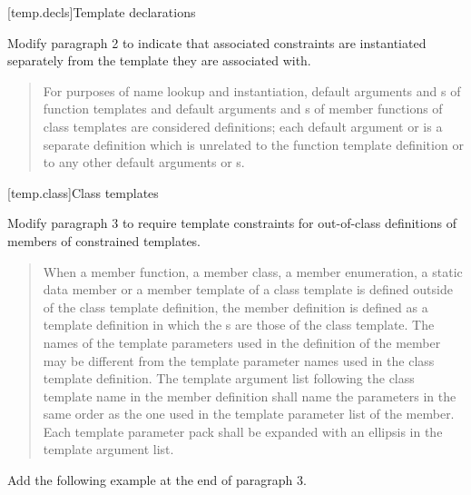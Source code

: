 \setcounter{section}{5}
[temp.decls]{Template declarations}

Modify paragraph 2 to indicate that associated constraints are
instantiated separately from the template they are associated with.

\begin{quote}
\setcounter{Paras}{1}
For purposes of name lookup and instantiation, default 
arguments and
s of function templates and default
arguments and 
s of member functions of class
templates are considered definitions; each default 
argument or 
 is a separate definition which is 
unrelated to the function template definition or to any other default 
arguments or 
s.
\end{quote}


[temp.class]{Class templates}

Modify paragraph 3 to require template constraints for out-of-class
definitions of members of constrained templates. 

\begin{quote}
\setcounter{Paras}{2}
\pnum
When a member function, a member class, a member enumeration, a static 
data member or a member template of a class template is defined outside 
of the class template definition, the member definition is defined as a 
template definition in which the s
 are those of the class template.
% 
The names of the template parameters used in the definition of the 
member may be different from the template parameter names used in the 
class template definition. The template argument list following the class
template name in the member definition shall name the parameters in the 
same order as the one used in the template parameter list of the member. 
% 
Each template parameter pack shall be expanded with an ellipsis in the 
template argument list.
\end{quote}

Add the following example at the end of paragraph 3.

